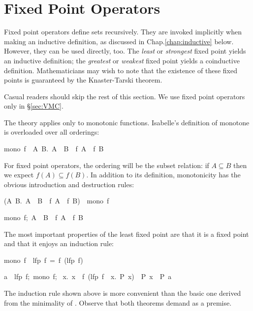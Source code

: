 \section{Fixed Point Operators}

%
Fixed point operators define sets
recursively.  They are invoked implicitly when making an inductive
definition, as discussed in Chap.\ts\ref{chap:inductive} below.  However,
they can be used directly, too. The
\emph{least}  or \emph{strongest} fixed point yields an inductive
definition;  the \emph{greatest} or \emph{weakest} fixed point yields a
coinductive  definition.  Mathematicians may wish to note that the
existence  of these fixed points is guaranteed by the Knaster-Tarski
theorem. 

\begin{warn}
Casual readers should skip the rest of this section.  We use fixed point
operators only in \S\ref{sec:VMC}.
\end{warn}

The theory applies only to monotonic functions. 
Isabelle's definition of monotone is overloaded over all orderings:
\begin{isabelle}
mono\ f\ \isasymequiv\ {\isasymforall}A\ B.\ A\ \isasymle\ B\ \isasymlongrightarrow\ f\ A\ \isasymle\ f\ B%
\end{isabelle}
%
For fixed point operators, the ordering will be the subset relation: if
$A\subseteq B$ then we expect $f(A)\subseteq f(B)$.  In addition to its
definition, monotonicity has the obvious introduction and destruction
rules:
\begin{isabelle}
({\isasymAnd}A\ B.\ A\ \isasymle\ B\ \isasymLongrightarrow\ f\ A\ \isasymle\ f\ B)\ \isasymLongrightarrow\ mono\ f%
%
\par\smallskip%
{\isasymlbrakk}mono\ f;\ A\ \isasymle\ B\isasymrbrakk\
\isasymLongrightarrow\ f\ A\ \isasymle\ f\ B%
\end{isabelle}

The most important properties of the least fixed point are that 
it is a fixed point and that it enjoys an induction rule: 
\begin{isabelle}
mono\ f\ \isasymLongrightarrow\ lfp\ f\ =\ f\ (lfp\ f)
%
\par\smallskip%
{\isasymlbrakk}a\ \isasymin\ lfp\ f;\ mono\ f;\isanewline
  \ {\isasymAnd}x.\ x\
\isasymin\ f\ (lfp\ f\ \isasyminter\ \isacharbraceleft x.\ P\
x\isacharbraceright)\ \isasymLongrightarrow\ P\ x\isasymrbrakk\
\isasymLongrightarrow\ P\ a%
\rulename{lfp_induct}
\end{isabelle}
%
The induction rule shown above is more convenient than the basic 
one derived from the minimality of {}.  Observe that both theorems
demand  as a premise.

